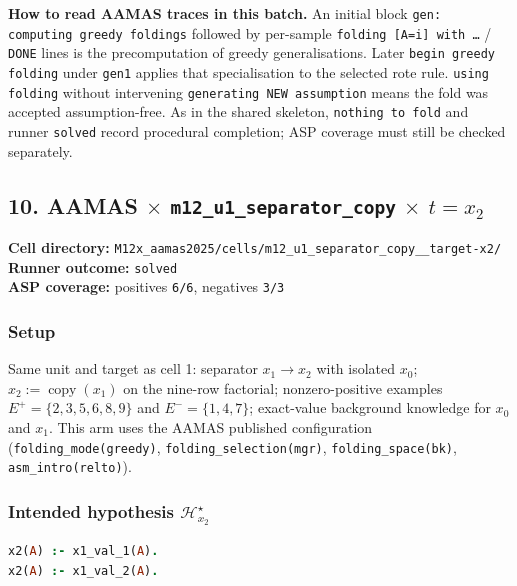 \documentclass[11pt]{article}
\begin{document}
\textbf{How to read AAMAS traces in this batch.} An initial block \texttt{gen: computing greedy foldings} followed by per-sample \texttt{folding [A=i] with \ldots{}} / \texttt{DONE} lines is the precomputation of greedy generalisations. Later \texttt{begin greedy folding} under \texttt{gen1} applies that specialisation to the selected rote rule. \texttt{using folding} without intervening \texttt{generating NEW assumption} means the fold was accepted assumption-free. As in the shared skeleton, \texttt{nothing to fold} and runner \texttt{solved} record procedural completion; ASP coverage must still be checked separately.

\subsection{\texorpdfstring{10. AAMAS \(\times\) \texttt{m12\_u1\_separator\_copy} \(\times\) \(t=x_2\)}{10. AAMAS - m12-u1-separator-copy - target x2}}

\textbf{Cell directory:} \texttt{M12x\_aamas2025/cells/m12\_u1\_separator\_copy\_\_target-x2/}\\
\textbf{Runner outcome:} \texttt{solved}\\
\textbf{ASP coverage:} positives \texttt{6/6}, negatives \texttt{3/3}

\subsubsection{Setup}

Same unit and target as cell 1: separator \(x_1\to x_2\) with isolated \(x_0\);
\(x_2:=\operatorname{copy}(x_1)\) on the nine-row factorial; nonzero-positive examples
\(E^+=\{2,3,5,6,8,9\}\) and \(E^-=\{1,4,7\}\); exact-value background knowledge for
\(x_0\) and \(x_1\). This arm uses the AAMAS published configuration
(\texttt{folding\_mode(greedy)}, \texttt{folding\_selection(mgr)},
\texttt{folding\_space(bk)}, \texttt{asm\_intro(relto)}).

\subsubsection{\texorpdfstring{Intended hypothesis \(\mathcal{H}_{x_2}^\star\)}{Intended hypothesis H-star(x2)}}

\begin{lstlisting}[style=logic,language=Prolog]
x2(A) :- x1_val_1(A).
x2(A) :- x1_val_2(A).
\end{lstlisting}
\end{document}
